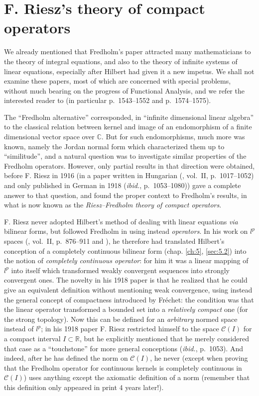 \documentclass[12pt,a4paper,leqno,twoside]{extbook}
\newcommand{\Cont}{\mathcal{C}}
\newcommand{\C}{\mathbb{C}}
\newcommand{\R}{\mathbb{R}}
\begin{document}
\section{F. Riesz's theory of compact operators}
\label{sec:7.1}

We already mentioned that Fredholm's paper attracted many mathematicians to the theory of integral equations, and also to the theory of infinite systems of linear equations, especially after Hilbert had given it a new impetus. We shall not examine these papers, most of which are concerned with special problems, without much bearing on the progress of Functional Analysis, and we refer the interested reader to \cite{107} (in particular p.~1543--1552 and p.~1574--1575).

The ``Fredholm alternative'' corresponded, in ``infinite dimensional linear algebra'' to the classical relation between kernel and image of an endomorphism of a finite dimensional vector space over \(\C\). But for such endomorphisms, much more was known, namely the Jordan normal form which characterized them up to ``similitude'', and a natural question was to investigate similar properties of the Fredholm operators. However, only partial results in that direction were obtained, before F. Riesz in 1916 (in a paper written in Hungarian (\cite{183}, vol.~II, p.~1017--1052) and only published in German in 1918 (\emph{ibid.}, p.~1053--1080)) gave a complete answer to that question, and found the proper context to Fredholm's results, in what is now known as the \emph{Riesz--Fredholm theory of compact operators}.

F. Riesz never adopted Hilbert's method of dealing with linear equations \emph{via} bilinear forms, but followed Fredholm in using instead \emph{operators}. In his work on \(l^p\) spaces (\cite{183}, vol.~II, p.~876--911 and \cite{184}), he therefore had translated Hilbert's conception of a completely continuous bilinear form (chap. \ref{ch:5}, \ref{sec:5.2}) into the notion of \emph{completely continuous operator}: for him it was a linear mapping of \(l^p\) into itself which transformed weakly convergent sequences into strongly convergent ones. The novelty in his 1918 paper is that he realized that he could give an equivalent definition without mentioning weak convergence, using instead the general concept of compactness introduced by Fréchet: the condition was that the linear operator transformed a bounded set into a \emph{relatively compact} one (for the strong topology). Now this can be defined for an \emph{arbitrary} normed space instead of \(l^p\); in his 1918 paper F. Riesz restricted himself to the space \(\Cont(I)\) for a compact interval \(I \subset \R\), but he explicitly mentioned that he merely considered that case as a ``touchstone'' for more general conceptions (\emph{ibid.}, p.~1053). And indeed, after he has defined the norm on \(\Cont(I)\), he never (except when proving that the Fredholm operator for continuous kernels is completely continuous in \(\Cont(I)\)) uses anything except the axiomatic definition of a norm (remember that this definition only appeared in print 4 years later!).
\end{document}
